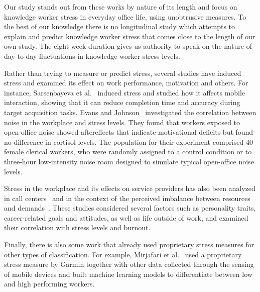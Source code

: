 Our study stands out from these works by nature of its length and focus on knowledge worker stress in everyday office life, using unobtrusive measures. To the best of our knowledge there is no longitudinal study which attempts to explain and predict knowledge worker stress that comes close to the length of our own study. The eight week duration gives us authority to speak on the nature of day-to-day fluctuations in knowledge worker stress levels.


Rather than trying to measure or predict stress, several studies have induced stress and examined its effect on work performance, motivation and others. For instance, Sarsenbayeva et al.~\cite{Sarsenbayeva19} induced stress and studied how it affects mobile interaction, showing that it can reduce completion time and accuracy during target acquisition tasks. Evans and Johnson~\cite{evans00} investigated the correlation between noise in the workplace and stress levels. They found that workers exposed to open-office noise showed aftereffects that indicate motivational deficits but found no difference in cortisol levels. The population for their experiment comprised 40 female clerical workers, who were randomly assigned to a control condition or to three-hour low-intensity noise room designed to simulate typical open-office noise levels.

Stress in the workplace and its effects on service providers has also been analyzed in call centers~\cite{Hernandez11} and in the context of the perceived imbalance between resources and demands~\cite{cherniss80}. These studies considered several factors such as personality traits, career-related goals and attitudes, as well as life outside of work, and examined their correlation with stress levels and burnout.

Finally, there is also some work that already used proprietary stress measures for other types of classification. For example, Mirjafari et al.~\cite{Mirjafari19} used a proprietary stress measure by Garmin together with other data collected through the sensing of mobile devices and built machine learning models to differentiate between low and high performing workers.



